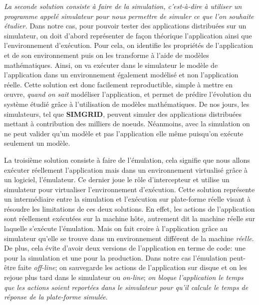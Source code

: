 {\color{red}\textit{La seconde solution consiste à faire de la simulation, c'est-à-dire à utiliser un programme appelé simulateur pour nous permettre de simuler ce que l'on souhaite étudier.}} Dans notre cas, pour pouvoir tester des applications distribuées sur un simulateur, on doit d'abord représenter de façon théorique l'application ainsi que l'environnement d'exécution. Pour cela, on identifie les propriétés de l'application et de son environnement puis on les transforme à l'aide de modèles mathématiques. Ainsi, on va exécuter dans le simulateur le modèle de l'application dans un environnement également modélisé et non l'application réelle. Cette solution est donc facilement reproductible, simple à mettre en \oe uvre, \textit{ quand on sait} modéliser l'application, et permet de prédire l'évolution du système étudié grâce à l'utilisation de modèles mathématiques. De nos jours, les simulateurs, tel que  \textbf{SIMGRID}\citet{SIMULATION:CASANOVA, SIMULATION:MARTIN}, peuvent simuler des applications distribuées mettant à contribution des milliers de noeuds. Néanmoins, avec la simulation on ne peut valider qu'un modèle et pas l'application elle même puisqu'on exécute seulement un modèle. 

La troisième solution consiste à faire de l'émulation, cela signifie que nous allons exécuter réellement l'application mais dans un environnement virtualisé grâce à un logiciel, l'émulateur. Ce dernier joue le rôle d'intercepteur et utilise un simulateur pour virtualiser l'environnement d'exécution.
Cette solution représente un intermédiaire entre la simulation et l'exécution sur plate-forme réelle visant à résoudre les limitations de ces deux solutions. En effet, les actions de l'application sont réellement exécutées sur la machine hôte, autrement dit la machine réelle sur laquelle s'exécute l'émulation. Mais on fait croire à l'application grâce au simulateur qu'elle se trouve dans un environnement différent de la machine \textit{réelle}. De plus, cela évite d'avoir deux versions de l'application en terme de code: une pour la simulation et une pour la production. Dans notre cas l'émulation peut-être faite \textit{off-line}; on sauvegarde les actions de l'application sur disque et on les rejoue plus tard dans le simulateur ou \textit{on-line}; \textit{ on bloque l'application le temps que les actions soient reportées dans le simulateur pour qu'il calcule le temps de réponse de la plate-forme simulée}.

